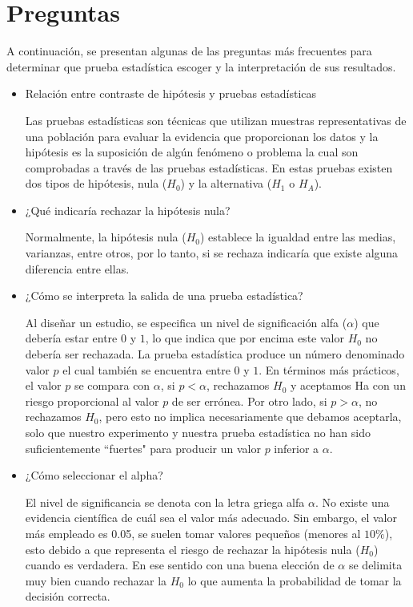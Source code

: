\documentclass{article}
\begin{document}
\section{Preguntas}

A continuación, se presentan algunas de las preguntas más frecuentes para determinar que prueba estadística escoger y la interpretación de sus resultados.

\begin{itemize}
    \item Relación entre contraste de hipótesis y pruebas estadísticas
    
    Las pruebas estadísticas son técnicas que utilizan muestras representativas de una población para evaluar la evidencia que proporcionan los datos y la hipótesis es la suposición de algún fenómeno o problema la cual son comprobadas a través de las pruebas estadísticas. En estas pruebas existen dos tipos de hipótesis, nula ($H_{0}$) y la alternativa ($H_{1}$ o $H_{A}$).

    \item ¿Qué indicaría rechazar la hipótesis nula?
    
    Normalmente, la hipótesis nula ($H_{0}$) establece la igualdad entre las medias, varianzas, entre otros, por lo tanto, si se rechaza indicaría que existe alguna diferencia entre ellas.
    
    \item ¿Cómo se interpreta la salida de una prueba estadística?
    
    Al diseñar un estudio, se especifica un nivel de significación alfa ($\alpha$) que debería estar entre $0$ y $1$, lo que indica que por encima este valor $H_{0}$ no debería ser rechazada. La prueba estadística produce un número denominado valor $p$ el cual también se encuentra entre $0$ y $1$. En términos más prácticos, el valor $p$ se compara con $\alpha$, si $p < \alpha$, rechazamos $H_{0}$ y aceptamos Ha con un riesgo proporcional al valor $p$ de ser errónea. Por otro lado, si $p > \alpha$, no rechazamos $H_{0}$, pero esto no implica necesariamente que debamos aceptarla, solo que nuestro experimento y nuestra prueba estadística no han sido suficientemente ``fuertes" para producir un valor $p$ inferior a $\alpha$.

    \item ¿Cómo seleccionar el alpha?
    
    El nivel de significancia se denota con la letra griega alfa $\alpha$. No existe una evidencia científica de cuál sea el valor más adecuado. Sin embargo, el valor más empleado es 0.05, se suelen tomar valores pequeños (menores al $10\%$), esto debido a que representa el riesgo de rechazar la hipótesis nula ($H_{0}$) cuando es verdadera. En ese sentido con una buena elección de $\alpha$ se delimita muy bien cuando rechazar la $H_{0}$ lo que aumenta la probabilidad de tomar la decisión correcta.
    

\end{itemize}
\end{document}
